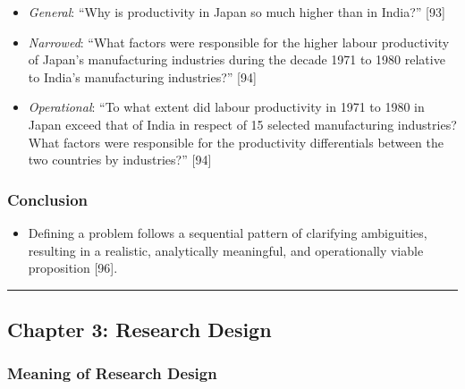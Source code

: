 \documentclass[
]{article}
\providecommand{\tightlist}{%
  \setlength{\itemsep}{0pt}\setlength{\parskip}{0pt}}
\begin{document}
\begin{itemize}
\tightlist
\item
  \emph{General}: ``Why is productivity in Japan so much higher than in
  India?'' {[}93{]}
\item
  \emph{Narrowed}: ``What factors were responsible for the higher labour
  productivity of Japan's manufacturing industries during the decade
  1971 to 1980 relative to India's manufacturing industries?'' {[}94{]}
\item
  \emph{Operational}: ``To what extent did labour productivity in 1971
  to 1980 in Japan exceed that of India in respect of 15 selected
  manufacturing industries? What factors were responsible for the
  productivity differentials between the two countries by industries?''
  {[}94{]}
\end{itemize}

\subsubsection{Conclusion}\label{conclusion}

\begin{itemize}
\tightlist
\item
  Defining a problem follows a sequential pattern of clarifying
  ambiguities, resulting in a realistic, analytically meaningful, and
  operationally viable proposition {[}96{]}.
\end{itemize}

\begin{center}\rule{0.5\linewidth}{0.5pt}\end{center}

\subsection{Chapter 3: Research Design}\label{chapter-3-research-design}

\subsubsection{Meaning of Research
Design}\label{meaning-of-research-design}
\end{document}
